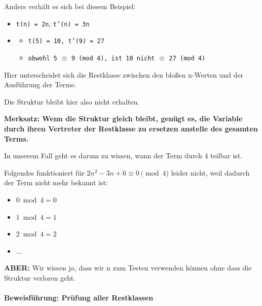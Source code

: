 \documentclass{article}
\begin{document}
      
Anders verhält es sich bei diesem Beispiel:


      \begin{itemize}
        \item \texttt{t(n) = 2n}, \texttt{t'(n) = 3n}

        \item 
          \begin{itemize}
            \item \texttt{t(5) = 10, t'(9) = 27}

            \item \texttt{obwohl 5} $\equiv$ \texttt{9 (mod 4), ist 10 nicht} $\equiv$ \texttt{27 (mod 4)}

          \end{itemize}
        

      \end{itemize}

      
Hier unterscheidet sich die Restklasse zwischen den bloßen n-Werten und der Ausführung der Terme.

      
Die Struktur bleibt hier also nicht erhalten.


      \textbf{
        Merksatz: Wenn die Struktur gleich bleibt, genügt es, die Variable durch ihren Vertreter der Restklasse zu ersetzen anstelle des gesamten Terms.
      }

      
In unserem Fall geht es darum zu wissen, wann der Term durch 4 teilbar ist.
      


      
Folgendes funktioniert für $2n^2 - 3n + 6 \equiv 0 \pmod{4}$ leider nicht, weil dadurch der Term nicht mehr bekannt ist:


      \begin{itemize}
        \item $0 \bmod 4 = 0$

        \item $1 \bmod 4 = 1$

        \item $2 \bmod 4 = 2$

        \item ...

      \end{itemize}

      
\textbf{ABER:} Wir wissen ja, dass wir n zum Testen verwenden können ohne dass die Struktur verloren geht.


      \paragraph{Beweisführung: Prüfung aller Restklassen}
      
\end{document}
